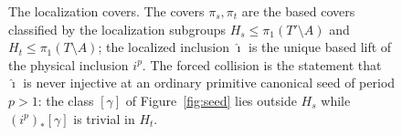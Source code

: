 \begin{figure}[t]
\centering
{}
\caption{The localization covers.  The covers \(\pi_{s},\pi_{t}\) are the
based covers classified by the localization subgroups
\(H_{s}\le\pi_{1}(T'\setminus A)\) and \(H_{t}\le\pi_{1}(T\setminus A)\); the localized inclusion
\(\widehat{\imath}\) is the unique based lift of the physical inclusion
\(i^{p}\).  The forced collision is the statement that
\(\widehat{\imath}\) is never injective at an ordinary primitive canonical
seed of period \(p>1\): the class \([\gamma]\) of
Figure~\ref{fig:seed} lies outside \(H_{s}\) while
\((i^{p})_{*}[\gamma]\) is trivial in \(H_{t}\).}
\label{fig:covers}
\end{figure}